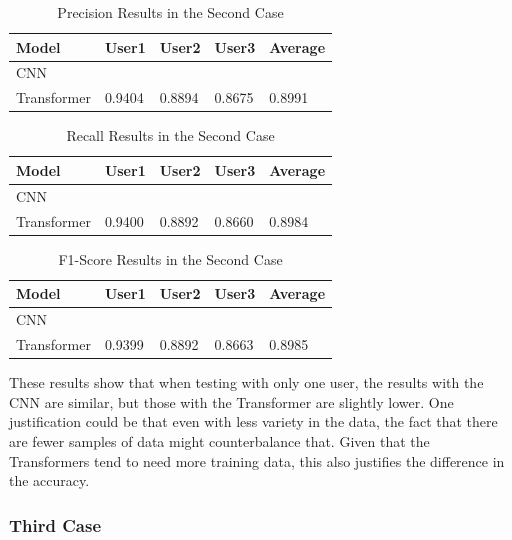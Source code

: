 \begin{table}[H]
    \centering
    \caption{Precision Results in the Second Case}
    \label{table:results_second_case_precision}
    \begin{tabular}{|l|l|l|l|l|}
        \hline
        Model & User1 & User2 & User3 & Average \\
        \hline
        CNN & & & & \\
        \hline
        Transformer & 0.9404 & 0.8894 & 0.8675 & 0.8991 \\
        \hline
    \end{tabular}
\end{table}

\begin{table}[H]
    \centering
    \caption{Recall Results in the Second Case}
    \label{table:results_second_case_recall}
    \begin{tabular}{|l|l|l|l|l|}
        \hline
        Model & User1 & User2 & User3 & Average \\
        \hline
        CNN & & & & \\
        \hline
        Transformer & 0.9400 & 0.8892 & 0.8660 & 0.8984 \\
        \hline
    \end{tabular}
\end{table}

\begin{table}[H]
    \centering
    \caption{F1-Score Results in the Second Case}
    \label{table:results_second_case_f1_score}
    \begin{tabular}{|l|l|l|l|l|}
        \hline
        Model & User1 & User2 & User3 & Average \\
        \hline
        CNN & & & & \\
        \hline
        Transformer & 0.9399 & 0.8892 & 0.8663 & 0.8985 \\
        \hline
    \end{tabular}
\end{table}

These results show that when testing with only one user, the results with the CNN are similar, but those with the Transformer are slightly lower. One justification could be that even with less variety in the data, the fact that there are fewer samples of data might counterbalance that. Given that the Transformers tend to need more training data, this also justifies the difference in the accuracy.

\subsubsection{Third Case}

